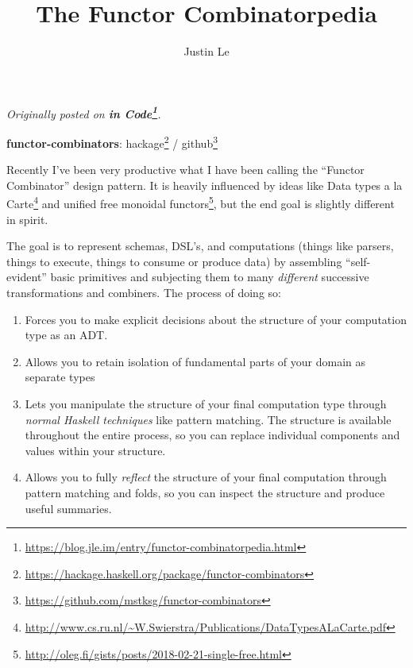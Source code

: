 \documentclass[]{article}
\title{The Functor Combinatorpedia}
\author{Justin Le}
\renewcommand{\href}[2]{#2\footnote{\url{#1}}}
\begin{document}
\maketitle

\emph{Originally posted on
\textbf{\href{https://blog.jle.im/entry/functor-combinatorpedia.html}{in
Code}}.}

\textbf{functor-combinators}:
\href{https://hackage.haskell.org/package/functor-combinators}{hackage} /
\href{https://github.com/mstksg/functor-combinators}{github}

Recently I've been very productive what I have been calling the ``Functor
Combinator'' design pattern. It is heavily influenced by ideas like
\href{http://www.cs.ru.nl/~W.Swierstra/Publications/DataTypesALaCarte.pdf}{Data
types a la Carte} and
\href{http://oleg.fi/gists/posts/2018-02-21-single-free.html}{unified free
monoidal functors}, but the end goal is slightly different in spirit.

The goal is to represent schemas, DSL's, and computations (things like parsers,
things to execute, things to consume or produce data) by assembling
``self-evident'' basic primitives and subjecting them to many \emph{different}
successive transformations and combiners. The process of doing so:

\begin{enumerate}
\def\labelenumi{\arabic{enumi}.}
\tightlist
\item
  Forces you to make explicit decisions about the structure of your computation
  type as an ADT.
\item
  Allows you to retain isolation of fundamental parts of your domain as separate
  types
\item
  Lets you manipulate the structure of your final computation type through
  \emph{normal Haskell techniques} like pattern matching. The structure is
  available throughout the entire process, so you can replace individual
  components and values within your structure.
\item
  Allows you to fully \emph{reflect} the structure of your final computation
  through pattern matching and folds, so you can inspect the structure and
  produce useful summaries.
\end{enumerate}
\end{document}
